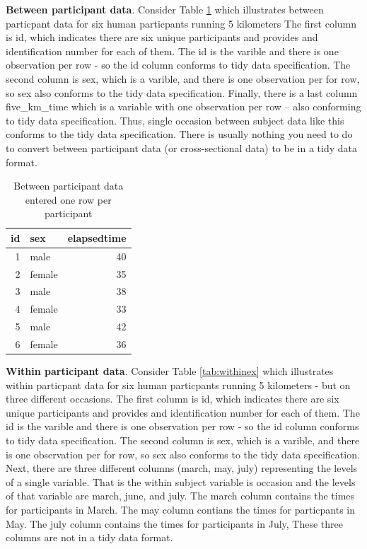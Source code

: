 \documentclass[
]{krantz}
\begin{document}
\textbf{Between participant data}. Consider Table \ref{tab:betweenex} which illustrates between particpant data for six human particpants running 5 kilometers The first column is id, which indicates there are six unique participants and provides and identification number for each of them. The id is the varible and there is one observation per row - so the id column conforms to tidy data specification. The second column is sex, which is a varible, and there is one observation per for row, so sex also conforms to the tidy data specification. Finally, there is a last column five\_km\_time which is a variable with one observation per row -- also conforming to tidy data specification. Thus, single occasion between subject data like this conforms to the tidy data specification. There is usually nothing you need to do to convert between participant data (or cross-sectional data) to be in a tidy data format.

\begin{table}

\caption{\label{tab:betweenex}Between participant data entered one row per participant}
\centering
\begin{tabular}[t]{rlr}
\toprule
id & sex & elapsedtime\\
\midrule
1 & male & 40\\
2 & female & 35\\
3 & male & 38\\
4 & female & 33\\
5 & male & 42\\
6 & female & 36\\
\bottomrule
\end{tabular}
\end{table}

\textbf{Within participant data}. Consider Table \ref{tab:withinex} which illustrates within particpant data for six human particpants running 5 kilometers - but on three different occasions. The first column is id, which indicates there are six unique participants and provides and identification number for each of them. The id is the varible and there is one observation per row - so the id column conforms to tidy data specification. The second column is sex, which is a varible, and there is one observation per for row, so sex also conforms to the tidy data specification. Next, there are three different columns (march, may, july) representing the levels of a single variable. That is the within subject variable is occasion and the levels of that variable are march, june, and july. The march column contains the times for participants in March. The may column contians the times for particpants in May. The july column contains the times for participants in July, These three columns are not in a tidy data format.
\end{document}
